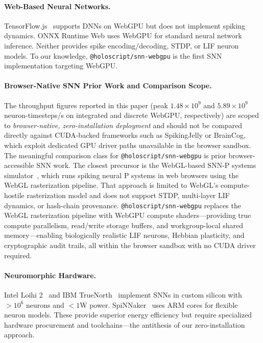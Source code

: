 \documentclass[10pt]{article}
\makeatletter
\newcommand{\snnwebgpu}{\texttt{@holoscript/snn-webgpu}}
\makeatother
\begin{document}
\paragraph{Web-Based Neural Networks.}
TensorFlow.js~\cite{smilkov2019tensorflow} supports DNNs on WebGPU but does
not implement spiking dynamics.
ONNX Runtime Web uses WebGPU for standard neural network inference.
Neither provides spike encoding/decoding, STDP, or LIF neuron models.
To our knowledge, \snnwebgpu{} is the first SNN implementation targeting WebGPU.

\paragraph{Browser-Native SNN Prior Work and Comparison Scope.}
The throughput figures reported in this paper (peak $1.48 \times 10^9$ and
$5.89 \times 10^9$ neuron-timesteps/s on integrated and discrete WebGPU,
respectively) are scoped to \emph{browser-native, zero-installation deployment}
and should not be compared directly against CUDA-backed frameworks such as
SpikingJelly or BrainCog, which exploit dedicated GPU driver paths unavailable
in the browser sandbox.
The meaningful comparison class for \snnwebgpu{} is prior browser-accessible SNN work.
The closest precursor is the WebGL-based SNN-P systems simulator~\cite{cabarle2022webgl},
which runs spiking neural P systems in web browsers using the WebGL rasterization pipeline.
That approach is limited to WebGL's compute-hostile rasterization model and does
not support STDP, multi-layer LIF dynamics, or hash-chain provenance.
\snnwebgpu{} replaces the WebGL rasterization pipeline with WebGPU compute
shaders---providing true compute parallelism, read/write storage buffers, and
workgroup-local shared memory---enabling biologically realistic LIF neurons,
Hebbian plasticity, and cryptographic audit trails, all within the browser
sandbox with no CUDA driver required.

\paragraph{Neuromorphic Hardware.}
Intel Loihi 2~\cite{davies2018loihi} and IBM TrueNorth~\cite{merolla2014truenorth}
implement SNNs in custom silicon with $>10^6$ neurons and $< 1$W power.
SpiNNaker~\cite{furber2014spinnaker} uses ARM cores for flexible neuron models.
These provide superior energy efficiency but require specialized hardware
procurement and toolchains---the antithesis of our zero-installation approach.
\end{document}
